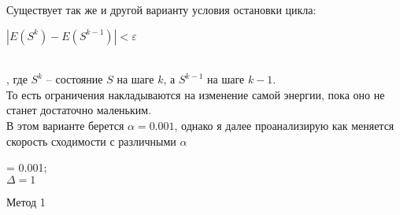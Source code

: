 \documentclass[ 12pt,x11names]{article}
\begin{document}
    Существует так же и другой варианту условия остановки цикла:\\
    \begin{center}
    $ | E(S^k) - E(S^{k-1}) | < \varepsilon$
     \end{center}\\
     , где $S^k$ -- состояние $S$ на шаге $k$, а $S^{k-1}$ на шаге $k-1$.\\
     То есть ограничения накладываются на изменение самой энергии, пока оно не станет достаточно маленьким.\\
    В этом варианте берется $\alpha = 0.001$, однако я далее проанализирую как меняется скорость сходимости  с различными $\alpha$\\
    \begin{algorithm}[H]
		\SetAlgoLined
		\alpha = 0.001;\\
		$ \Delta  = 1$\\
	\caption{Метод 1}
    \end{algorithm}
\end{document}

